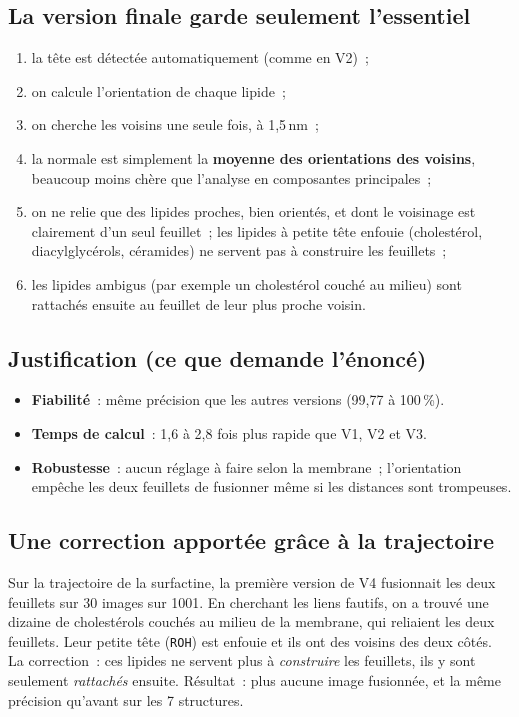\documentclass[11pt,a4paper]{article}
\newcommand{\f}[1]{\texttt{#1}}
\begin{document}
\subsection{La version finale garde seulement l'essentiel}
\begin{enumerate}
\item la tête est détectée automatiquement (comme en V2)~;
\item on calcule l'orientation de chaque lipide~;
\item on cherche les voisins une seule fois, à 1,5\,nm~;
\item la normale est simplement la \textbf{moyenne des orientations des voisins}, beaucoup moins chère que
l'analyse en composantes principales~;
\item on ne relie que des lipides proches, bien orientés, et dont le voisinage est clairement d'un seul
feuillet~; les lipides à petite tête enfouie (cholestérol, diacylglycérols, céramides) ne servent pas à
construire les feuillets~;
\item les lipides ambigus (par exemple un cholestérol couché au milieu) sont rattachés ensuite au feuillet de
leur plus proche voisin.
\end{enumerate}

\subsection{Justification (ce que demande l'énoncé)}
\begin{itemize}
\item \textbf{Fiabilité}~: même précision que les autres versions (99,77 à 100\,\%).
\item \textbf{Temps de calcul}~: 1,6 à 2,8 fois plus rapide que V1, V2 et V3.
\item \textbf{Robustesse}~: aucun réglage à faire selon la membrane~; l'orientation empêche les deux feuillets de
fusionner même si les distances sont trompeuses.
\end{itemize}

\subsection{Une correction apportée grâce à la trajectoire}
Sur la trajectoire de la surfactine, la première version de V4 fusionnait les deux feuillets sur 30 images sur 1001.
En cherchant les liens fautifs, on a trouvé une dizaine de cholestérols couchés au milieu de la membrane, qui
reliaient les deux feuillets. Leur petite tête (\f{ROH}) est enfouie et ils ont des voisins des deux côtés. La
correction~: ces lipides ne servent plus à \emph{construire} les feuillets, ils y sont seulement \emph{rattachés}
ensuite. Résultat~: plus aucune image fusionnée, et la même précision qu'avant sur les 7 structures.
\end{document}
